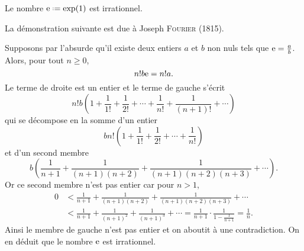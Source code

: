 \begin{prop}{}
    Le nombre $\me \defeq \exp(1)$ est irrationnel.
\end{prop}
La démonstration suivante est due à Joseph \textsc{Fourier} (1815).
\begin{preuve}
    Supposons par l'absurde qu'il existe deux entiers $a$ et $b$ non nuls tels que $\mathrm{e} = \frac{a}{b}$. Alors, pour tout $n \geqslant 0$,
    $$n! b \mathrm{e} = n! a.$$
    Le terme de droite est un entier et le terme de gauche s'écrit \note {}
    $$n! b \left(1 + \frac{1}{1!} + \frac{1}{2!} + \cdots + \frac{1}{n!} + \frac{1}{(n+1)!} + \cdots \right)$$
    qui se décompose en la somme d'un entier
    $$b n! \left(1 + \frac{1}{1!} + \frac{1}{2!} + \cdots + \frac{1}{n!} \right)$$
    et d'un second membre
    $$b \left( \frac{1}{n+1} + \frac{1}{(n+1)(n+2)} + \frac{1}{(n+1)(n+2)(n+3)}+ \cdots \right).$$
    Or ce second membre n'est pas entier car pour $n > 1$,
    \begin{align*}
        0 &< \frac{1}{n+1} + \frac{1}{(n+1)(n+2)} + \frac{1}{(n+1)(n+2)(n+3)} + \cdots \\
        & < \frac{1}{n+1} + \frac{1}{(n+1)^2} + \frac{1}{(n+1)^3} + \cdots = \frac{1}{n+1} \cdot \frac{1}{1-\frac{1}{n+1}} = \frac{1}{n}.
    \end{align*}
    Ainsi le membre de gauche n'est pas entier et on aboutit à une contradiction. On en déduit que le nombre $\mathrm{e}$ est irrationnel.
\end{preuve}

